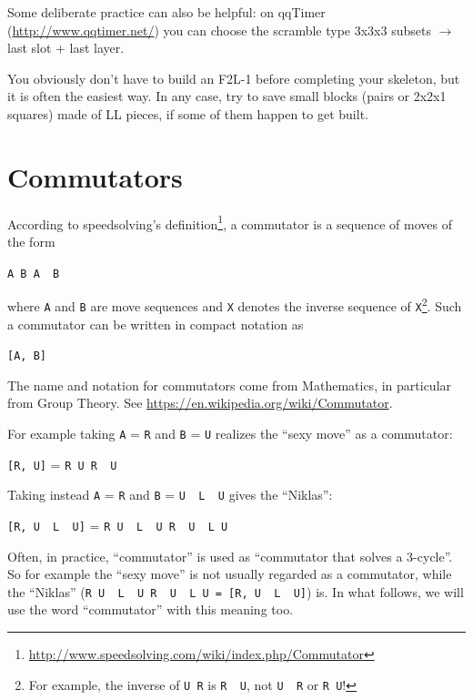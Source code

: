 \documentclass[11pt,a4paper]{book}
\newcommand{\p}{\textquotesingle}
\newcommand{\m}{\texttt}
\newcommand{\ps}{\p\,\,}
\begin{document}
Some deliberate practice can also be helpful: on qqTimer (\url{http://www.qqtimer.net/}) you can choose the scramble type 3x3x3 subsets $\rightarrow$ last slot + last layer.

You obviously don't have to build an F2L-1 before completing your skeleton, but it is often the easiest way. In any case, try to save small blocks (pairs or 2x2x1 squares) made of LL pieces, if some of them happen to get built.

\section{Commutators}

According to speedsolving's definition\footnote{\url{http://www.speedsolving.com/wiki/index.php/Commutator}}, a commutator is a sequence of moves of the form

\begin{center}
\m{A B A\ps B\p}
\end{center}

where \m A and \m B are move sequences and \m{X\p} denotes the inverse sequence of \m X\footnote{For example, the inverse of \m{U R} is \m{R\ps U\p}, not \m{U\ps R\p} or \m{R U}!}. Such a commutator can be written in compact notation as

\begin{center}
\m{[A, B]}
\end{center}

The name and notation for commutators come from Mathematics, in particular from Group Theory. See \url{https://en.wikipedia.org/wiki/Commutator}.

For example taking \m{A} = \m{R} and \m{B} = \m{U} realizes the ``sexy move'' as a commutator:
\begin{center}
\m{[R, U]} = \m{R U R\ps U\p}
\end{center}

Taking instead \m A = \m R and \m B = \m{U\ps L\ps U} gives the ``Niklas'':

\begin{center}
\m{[R, U\ps L\ps U]} = \m{R U\ps L\ps U R\ps U\ps L U}
\end{center}

Often, in practice, ``commutator'' is used as ``commutator that solves a 3-cycle''. So for example the ``sexy move'' is not usually regarded as a commutator, while the ``Niklas'' (\m{R U\ps L\ps U R\ps U\ps L U = [R, U\ps L\ps U]}) is. In what follows, we will use the word ``commutator'' with this meaning too.
\end{document}
